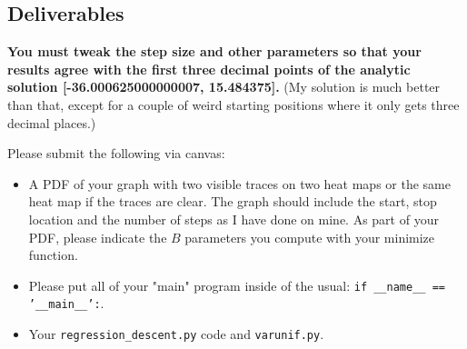\begin{fullwidth}
\section{Deliverables}

{\bf You must tweak the step size and other parameters so that your results agree with the first {\bf three} decimal points of the analytic solution [-36.000625000000007, 15.484375].} (My solution is much better than that, except for a couple of weird starting positions where it only gets three decimal places.)

Please submit the following via canvas:
 
\begin{itemize}
\item A PDF of your graph with two visible traces on two heat maps or the same heat map if the traces are clear. The graph should include the start, stop location and the number of steps as I have done on mine. As part of your PDF, please indicate the $B$ parameters you compute with your minimize function.
\item Please put all of your "main" program inside of the usual: {\tt if \_\_name\_\_ == '\_\_main\_\_':}.
\item Your {\tt regression\_descent.py} code and {\tt varunif.py}.
\end{itemize}

\end{fullwidth}

